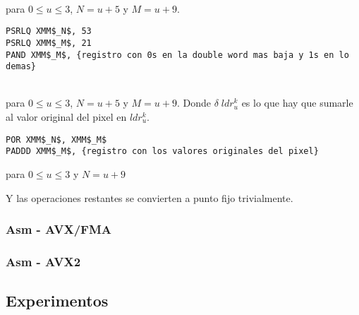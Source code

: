   \\
para $0 \le u \le 3$, $N = u+5$ y $M = u+9$.

\begin{lstlisting}
PSRLQ XMM$_N$, 53
PSRLQ XMM$_M$, 21
PAND XMM$_M$, {registro con 0s en la double word mas baja y 1s en lo demas}
\end{lstlisting}

 

  \\
para $0 \le u \le 3$, $N = u+5$ y $M = u+9$. Donde $\delta \; ldr^k_u$ es lo que hay que sumarle al valor original del pixel en $ldr^k_u$.

\begin{lstlisting}
POR XMM$_N$, XMM$_M$
PADDD XMM$_M$, {registro con los valores originales del pixel}
\end{lstlisting}

 
para $0 \le u \le 3$ y $N = u+9$

Y las operaciones restantes se convierten a punto fijo trivialmente.

\subsubsection{Asm - AVX/FMA}

\subsubsection{Asm - AVX2}

\subsection{Experimentos}

